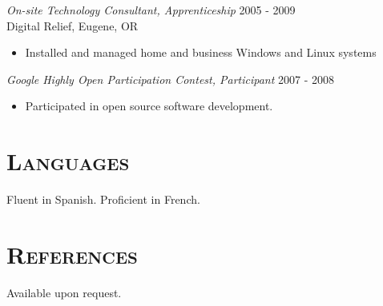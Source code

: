 \documentclass[margin]{res}
\begin{document}
\begin{resume}
    {\sl On-site Technology Consultant, Apprenticeship} \hfill 2005 - 2009 \\
    Digital Relief, Eugene, OR
    \begin{itemize}  \itemsep -2pt %
        \item Installed and managed home and business Windows and Linux systems
    \end{itemize}

    {\sl Google Highly Open Participation Contest, Participant} \hfill 2007 - 2008
    \begin{itemize}  \itemsep -2pt %
        \item Participated in open source software development.
    \end{itemize}

\section{\textsc{Languages}} Fluent in Spanish. Proficient in French.

\section{\textsc{References}} Available upon request.

\end{resume}
\end{document}
